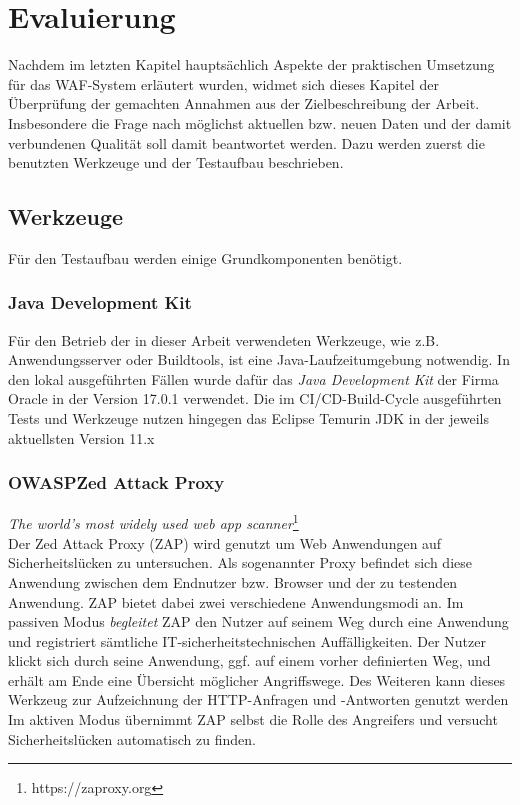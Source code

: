 \chapter{Evaluierung}


Nachdem im letzten Kapitel hauptsächlich Aspekte der praktischen Umsetzung für das WAF-System erläutert wurden, widmet sich dieses Kapitel der Überprüfung der gemachten Annahmen aus der Zielbeschreibung der Arbeit. Insbesondere die Frage nach möglichst aktuellen bzw. neuen Daten und der damit verbundenen Qualität soll damit beantwortet werden. Dazu werden zuerst die benutzten Werkzeuge und der Testaufbau beschrieben. 

\section{Werkzeuge}
Für den Testaufbau werden einige Grundkomponenten benötigt. 

\subsection{Java Development Kit}
Für den Betrieb der in dieser Arbeit verwendeten Werkzeuge, wie z.B. Anwendungsserver oder Buildtools, ist eine Java-Laufzeitumgebung notwendig. In den lokal ausgeführten Fällen wurde dafür das \emph{Java Development Kit} der Firma Oracle in der Version 17.0.1 verwendet. Die im CI/CD-Build-Cycle ausgeführten Tests und Werkzeuge nutzen hingegen das Eclipse Temurin JDK in der jeweils aktuellsten Version 11.x


\subsection{OWASP\textregistered  Zed Attack Proxy}
\label{ref:zap}

\emph{The world's most widely used web app scanner}\footnote{https://zaproxy.org}\\

Der Zed Attack Proxy (ZAP) wird genutzt um Web Anwendungen auf Sicherheitslücken zu untersuchen. Als sogenannter Proxy befindet sich diese Anwendung zwischen dem Endnutzer bzw. Browser und der zu testenden Anwendung. ZAP bietet dabei zwei verschiedene Anwendungsmodi an. Im passiven Modus \emph{begleitet} ZAP den Nutzer auf seinem Weg durch eine Anwendung und registriert sämtliche IT-sicherheitstechnischen Auffälligkeiten. Der Nutzer klickt sich durch seine Anwendung, ggf. auf einem vorher definierten Weg,  und erhält am Ende eine Übersicht möglicher Angriffswege. Des Weiteren kann dieses Werkzeug zur Aufzeichnung der HTTP-Anfragen und -Antworten genutzt werden\\ Im aktiven Modus übernimmt ZAP selbst die Rolle des Angreifers und versucht Sicherheitslücken automatisch zu finden. \\


